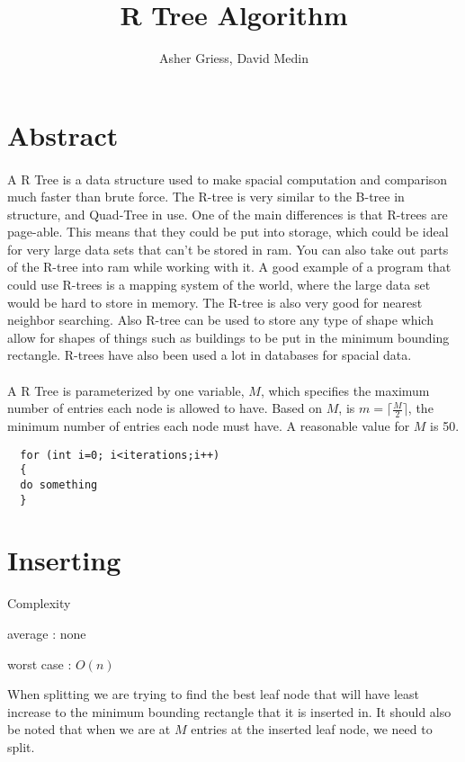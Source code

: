 \documentclass{article}
\author{Asher Griess, David Medin}
\title{R Tree Algorithm}
\begin{document}
\maketitle



\section{Abstract}
\paragraph{}
A R Tree is a data structure used to make spacial computation and comparison much faster than brute force.
The R-tree is very similar to the B-tree in structure, and Quad-Tree in use. One of the main differences is that
R-trees are page-able. This means that they could be put into storage, which could be ideal for very large data sets 
that can't be stored in ram.  You can also take out parts of the R-tree into ram while working with it. A good example
of a program that could use R-trees is a mapping system of the world, where the large data set would be hard to store in memory.
The R-tree is also very good for nearest neighbor searching. Also R-tree can be used to store any type of shape which allow for shapes
of things such as buildings to be put in the minimum bounding rectangle. R-trees have also been used a lot in databases for spacial data.
\paragraph{}
A R Tree is parameterized by one variable, $M$, which specifies the maximum number of entries each node is allowed to have. Based on $M$, is $m = \lceil\frac{M}{2}\rceil$, the minimum number of entries each node must have. A reasonable value for $M$ is 50. \cite{guttman_1984_rtrees}

\begin{lstlisting}
  for (int i=0; i<iterations;i++)
  {
  do something
  }
  \end{lstlisting}
  

\section{Inserting}
Complexity

average : none

worst case : $O(n)$

When splitting we are trying to find the best leaf node
that will have least increase to the minimum bounding rectangle that it is inserted in.
It should also be noted that when we are at $M$ entries at the inserted leaf node, we
need to split.
\end{document}
